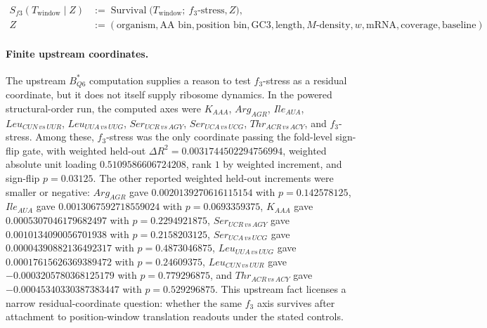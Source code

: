 $$
\begin{aligned}
S_{f3}(T_{\mathrm{window}}\mid Z) &:= \operatorname{Survival}\bigl(T_{\mathrm{window}};\ f_3\text{-stress}, Z\bigr),\\
Z &:= (\text{organism},\text{AA bin},\text{position bin},\text{GC3},\text{length},M\text{-density},w,\text{mRNA},\text{coverage},\text{baseline}).
\end{aligned}
$$

\paragraph{Finite upstream coordinates.}
The upstream $B^*_{Q6}$ computation supplies a reason to test $f_3$-stress as a residual coordinate, but it does not itself supply ribosome dynamics.  In the powered structural-order run, the computed axes were $K_{AAA}$, $Arg_{AGR}$, $Ile_{AUA}$, $Leu_{CUN\,vs\,UUR}$, $Leu_{UUA\,vs\,UUG}$, $Ser_{UCR\,vs\,AGY}$, $Ser_{UCA\,vs\,UCG}$, $Thr_{ACR\,vs\,ACY}$, and $f_3$-stress.  Among these, $f_3$-stress was the only coordinate passing the fold-level sign-flip gate, with weighted held-out $\Delta R^2=0.0031744502294756994$, weighted absolute unit loading $0.5109586606724208$, rank $1$ by weighted increment, and sign-flip $p=0.03125$.  The other reported weighted held-out increments were smaller or negative: $Arg_{AGR}$ gave $0.0020139270616115154$ with $p=0.142578125$, $Ile_{AUA}$ gave $0.0013067592718559024$ with $p=0.0693359375$, $K_{AAA}$ gave $0.0005307046179682497$ with $p=0.2294921875$, $Ser_{UCR\,vs\,AGY}$ gave $0.0010134090056701938$ with $p=0.2158203125$, $Ser_{UCA\,vs\,UCG}$ gave $0.00004390882136492317$ with $p=0.4873046875$, $Leu_{UUA\,vs\,UUG}$ gave $0.00017615626369389472$ with $p=0.24609375$, $Leu_{CUN\,vs\,UUR}$ gave $-0.0003205780368125179$ with $p=0.779296875$, and $Thr_{ACR\,vs\,ACY}$ gave $-0.00045340330387383447$ with $p=0.529296875$.  This upstream fact licenses a narrow residual-coordinate question: whether the same $f_3$ axis survives after attachment to position-window translation readouts under the stated controls.

